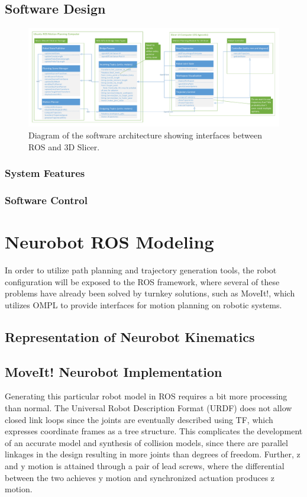 \documentclass[12pt]{report}
\begin{document}
\section{Software Design}
\begin{figure}[thpb]
	\centering
	\includegraphics[width=\textwidth]{diagrams/Software_Diagrams.pdf}
    \caption{Diagram of the software architecture showing interfaces between ROS and 3D Slicer. }
    \label{fig:softwareDiagram}
\end{figure}

\subsection{System Features}

\subsection{Software Control}

\chapter{Neurobot ROS Modeling}
In order to utilize path planning and trajectory generation tools, the robot configuration will be exposed to the ROS framework, where several of these problems have already been solved by turnkey solutions, such as MoveIt!, which utilizes OMPL to provide interfaces for motion planning on robotic systems. \cite{moveIt} 
\section{Representation of Neurobot Kinematics}

\section{MoveIt! Neurobot Implementation}
Generating this particular robot model in ROS requires a bit more processing than normal. The Universal Robot Description Format (URDF) does not allow closed link loops since the joints are eventually described using TF, which expresses coordinate frames as a tree structure. This complicates the development of an accurate model and synthesis of collision models, since there are parallel linkages in the design resulting in more joints than degrees of freedom. Further, z and y motion is attained through a pair of lead screws, where the differential between the two achieves y motion and synchronized actuation produces z motion. 
\end{document}
